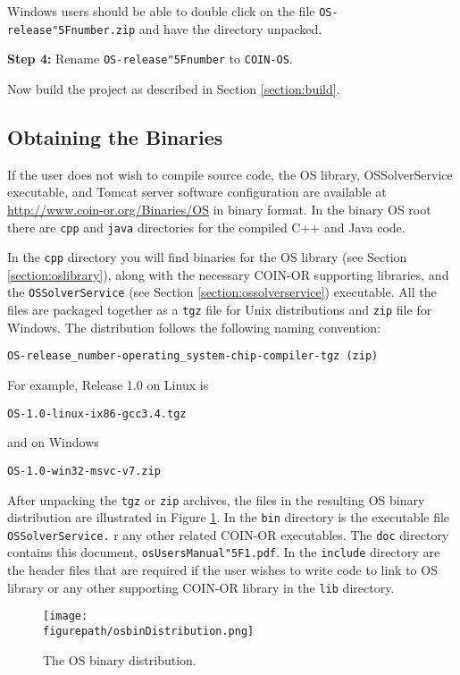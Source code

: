 \documentclass[11pt]{article}
\newcommand{\figurepath}{./figures}
\newcounter{Fig}
\renewcommand{\_}{{\char"5F}}
\renewcommand{\{}{{\char"7B}}
\renewcommand{\}}{{\char"7D}}
\renewcommand{\^}{{\char"0D}}
\renewcommand{\'}{{\char"0D}}
\begin{document}
Windows users should be  able to double click on the file {\tt OS-release\_number.zip} and have the directory unpacked.

\vskip 8pt

{\bf Step 4:} Rename {\tt OS-release\_number} to {\tt COIN-OS}.


Now build the project as described in  Section \ref{section:build}.








\subsection{Obtaining the Binaries}\label{section:obtainingbinaries}

If the user does not wish to compile source code, the
OS library, OSSolverService executable, and Tomcat server software configuration are available at \url{http://www.coin-or.org/Binaries/OS} in binary format.  In the binary OS root there  are {\tt cpp} and {\tt java} directories for the compiled C++ and Java code.

In the {\tt cpp} directory you will find binaries for the OS library (see Section \ref{section:oslibrary}), along with the necessary COIN-OR supporting libraries,  and the {\tt OSSolverService} (see Section \ref{section:ossolverservice})  executable.   All the files are packaged together as a {\tt tgz} file for Unix distributions and {\tt zip} file for Windows.  The distribution follows the following naming convention:

\begin{verbatim}
OS-release_number-operating_system-chip-compiler-tgz (zip)
\end{verbatim}
For example, Release 1.0 on Linux is
\begin{verbatim}
OS-1.0-linux-ix86-gcc3.4.tgz
\end{verbatim}
and on Windows
\begin{verbatim}
OS-1.0-win32-msvc-v7.zip
\end{verbatim}
After unpacking the {\tt tgz} or {\tt zip} archives, the files in the resulting OS binary distribution are illustrated in Figure \ref{figure:osbindistribution}.   In the {\tt bin} directory is the executable file {\tt OSSolverService.} r any other related COIN-OR executables. The {\tt doc} directory contains this document, {\tt osUsersManual\_1.pdf}.
  In the {\tt include} directory are the header files that are required if the user wishes to write code to link to OS library or any other supporting COIN-OR library in the {\tt lib} directory.
\begin{figure}
\centering
\texttt{[image: \\figurepath/osbinDistribution.png]}
\caption{The OS  binary distribution.}
\label{figure:osbindistribution}
\end{figure}
\end{document}
